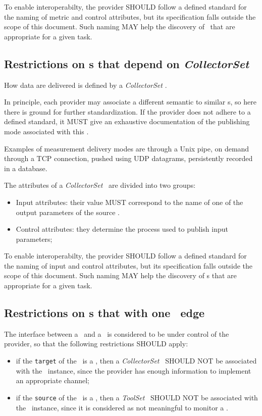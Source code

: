 \documentclass[12pt]{article}  %
\begin{document}
To enable interoperabilty, the provider SHOULD follow a defined standard for the naming of metric and control attributes, but its specification falls outside the scope of this document. Such naming MAY help the discovery of \mi\ that are appropriate for a given task.


\subsection{Restrictions on \mi s that depend on {\em CollectorSet} \label{sec:Collector}}

How data are delivered is defined by a {\em CollectorSet} \mi .

In principle, each provider may associate a different semantic to similar \mi s, so here there is ground for further standardization. If the provider does not adhere to a defined standard, it MUST give an exhaustive documentation of the publishing mode associated with this \mi.

Examples of measurement delivery modes are through a Unix pipe, on demand through a TCP connection, pushed using UDP datagrams, persistently recorded in a database.

The attributes of a {\em CollectorSet} \mi\ are divided into two groups:

\begin{itemize}
\item Input attributes: their value MUST correspond to the name of one of the output parameters of the source \sens .
\item Control attributes: they determine the process used to publish input parameters;
\end{itemize}

To enable interoperabilty, the provider SHOULD follow a defined standard for the naming of input and control attributes, but its specification falls outside the scope of this document. Such naming MAY help the discovery of \mi s that are appropriate for a given task.

\subsection{Restrictions on \coll s that with one \sens\ edge}

The interface between a \sens\ and a \coll\ is considered to be under control of the provider, so that the following restrictions SHOULD apply:

\begin{itemize}

\item if the {\tt target} of the \coll\ is a \sens, then a {\em CollectorSet} \mi\ SHOULD NOT be associated with the \coll\ instance, since the provider has enough information to implement an appropriate channel;

\item if the {\tt source} of the \coll\ is a \sens, then a {\em ToolSet} \mi\ SHOULD NOT be associated with the \coll\ instance, since it is considered as not meaningful to monitor a \sens.

\end{itemize}
\end{document}
